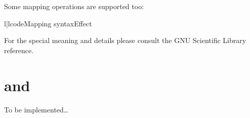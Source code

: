 Some mapping operations are supported too:\nopagebreak
\begin{tableii}{l|l}{code}{Mapping syntax}{Effect}
\end{tableii}


\begin{seealso}
For the special meaning and details please consult the GNU Scientific Library
reference.
\end{seealso}

\section{\protect{} and \protect{}}

To be implemented\dots


